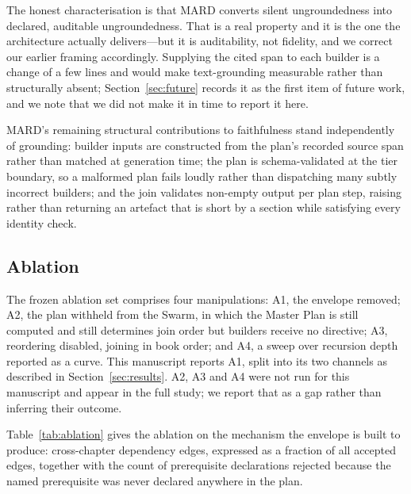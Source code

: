 \documentclass[conference]{IEEEtran}
\begin{document}
The honest characterisation is that MARD converts silent ungroundedness into
declared, auditable ungroundedness. That is a real property and it is the one
the architecture actually delivers---but it is auditability, not fidelity, and
we correct our earlier framing accordingly. Supplying the cited span to each
builder is a change of a few lines and would make text-grounding measurable
rather than structurally absent; Section~\ref{sec:future} records it as the
first item of future work, and we note that we did not make it in time to
report it here.

MARD's remaining structural contributions to faithfulness stand independently
of grounding: builder inputs are constructed from the plan's recorded source
span rather than matched at generation time; the plan is schema-validated at
the tier boundary, so a malformed plan fails loudly rather than dispatching
many subtly incorrect builders; and the join validates non-empty output per
plan step, raising rather than returning an artefact that is short by a
section while satisfying every identity check.

\subsection{Ablation}
\label{sec:ablation}
The frozen ablation set comprises four manipulations: A1, the envelope removed;
A2, the plan withheld from the Swarm, in which the Master Plan is still
computed and still determines join order but builders receive no directive;
A3, reordering disabled, joining in book order; and A4, a sweep over recursion
depth reported as a curve. This manuscript reports A1, split into its two
channels as described in Section~\ref{sec:results}. A2, A3 and A4 were not run
for this manuscript and appear in the full study; we report that as a gap
rather than inferring their outcome.

Table~\ref{tab:ablation} gives the ablation on the mechanism the envelope is
built to produce: cross-chapter dependency edges, expressed as a fraction of
all accepted edges, together with the count of prerequisite declarations
rejected because the named prerequisite was never declared anywhere in the
plan.
\end{document}
